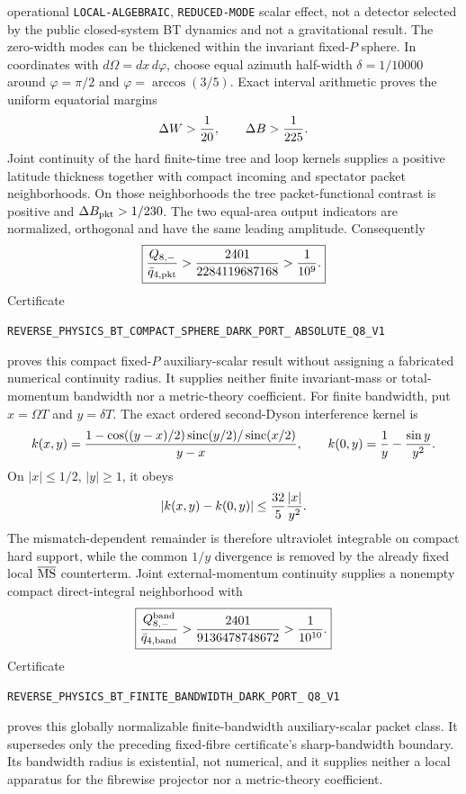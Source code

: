 \documentclass[11pt]{article}
\theoremstyle{definition}
\theoremstyle{remark}
\begin{document}
operational
\texttt{LOCAL-ALGEBRAIC}, \texttt{REDUCED-MODE} scalar effect, not a detector
selected by the public closed-system BT dynamics and not a gravitational
result.
The zero-width modes can be thickened within the invariant fixed-$P$ sphere.
In coordinates with $d\Omega=dx\,d\varphi$, choose equal azimuth half-width
$\delta=1/10000$ around $\varphi=\pi/2$ and
$\varphi=\arccos(3/5)$.  Exact interval arithmetic proves the uniform
equatorial margins
\[
 \Delta W>{1\over20},\qquad \Delta B>{1\over225}.
\]
Joint continuity of the hard finite-time tree and loop kernels supplies a
positive latitude thickness together with compact incoming and spectator
packet neighborhoods.  On those neighborhoods the tree packet-functional
contrast is positive and $\Delta B_{\rm pkt}>1/230$.  The two equal-area
output indicators are normalized, orthogonal and have the same leading
amplitude.  Consequently
\[
 \boxed{{Q_{8,-}\over\bar q_{4,\rm pkt}}
 >{2401\over2284119687168}>{1\over10^9}.}
\]
Certificate
\par\noindent
\texttt{REVERSE\_PHYSICS\_BT\_COMPACT\_SPHERE\_DARK\_PORT\_}
\allowbreak\texttt{ABSOLUTE\_Q8\_V1}
\par\noindent
proves this compact fixed-$P$ auxiliary-scalar result without assigning a
fabricated numerical continuity radius.  It supplies neither finite
invariant-mass or total-momentum bandwidth nor a metric-theory coefficient.
For finite bandwidth, put $x=\Omega T$ and $y=\delta T$.  The exact ordered
second-Dyson interference kernel is
\[
 k(x,y)={1-\cos((y-x)/2)\operatorname{sinc}(y/2)/
                 \operatorname{sinc}(x/2)\over y-x},
 \qquad k(0,y)={1\over y}-{\sin y\over y^2}.
\]
On $|x|\leq1/2$, $|y|\geq1$, it obeys
\[
 |k(x,y)-k(0,y)|\leq {32\over5}{|x|\over y^2}.
\]
The mismatch-dependent remainder is therefore ultraviolet integrable on
compact hard support, while the common $1/y$ divergence is removed by the
already fixed local $\overline{\rm MS}$ counterterm.  Joint external-momentum
continuity supplies a nonempty compact direct-integral neighborhood with
\[
 \boxed{{Q_{8,-}^{\rm band}\over\bar q_{4,\rm band}}
 >{2401\over9136478748672}>{1\over10^{10}}.}
\]
Certificate
\par\noindent
\texttt{REVERSE\_PHYSICS\_BT\_FINITE\_BANDWIDTH\_DARK\_PORT\_}
\allowbreak\texttt{Q8\_V1}
\par\noindent
proves this globally normalizable finite-bandwidth auxiliary-scalar packet
class.  It supersedes only the preceding fixed-fibre certificate's
sharp-bandwidth boundary.  Its bandwidth radius is existential, not
numerical, and it supplies neither a local apparatus for the fibrewise
projector nor a metric-theory coefficient.
\end{document}
